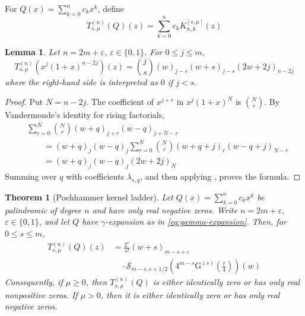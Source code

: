 \documentclass[a4paper,11pt,reqno]{amsart}
\numberwithin{equation}{section}
\newtheorem{theorem}{Theorem}
\newtheorem{lemma}{Lemma}
\theoremstyle{remark}
\newcommand{\Gpoly}{\mathrm{G}}     %
\begin{document}
For \(Q(x)=\sum_{k=0}^{n}c_kx^k\), define
\[
  T_{s,\mu}^{(n)}(Q)(z)
  =
  \sum_{k=0}^{n}c_kK_{n,k}^{[s,\mu]}(z)
\]

\begin{lemma}\label{lem:rung-action}
Let \(n=2m+\varepsilon\), \(\varepsilon\in\{0,1\}\). For \(0\leq j\leq m\),
\[
  T_{s,\mu}^{(n)}
  \left(x^j(1+x)^{n-2j}\right)(z)
  =
  \binom{j}{s}
  (w)_{j-s}(w+s)_{j-s}(2w+2j)_{n-2j}
\]
where the right-hand side is interpreted as \(0\) if \(j<s\).
\end{lemma}

\begin{proof}
Put \(N=n-2j\). The coefficient of \(x^{j+r}\) in \(x^j(1+x)^N\) is \(\binom Nr\). By Vandermonde's identity for rising factorials,
\[
\begin{aligned}
  &\sum_{r=0}^{N}\binom Nr
  (w+q)_{j+r}(w-q)_{j+N-r}  \\
  &\qquad =
  (w+q)_j(w-q)_j
  \sum_{r=0}^{N}\binom Nr
  (w+q+j)_r(w-q+j)_{N-r}  \\
  &\qquad =
  (w+q)_j(w-q)_j(2w+2j)_N
\end{aligned}
\]
Summing over \(q\) with coefficients \(\lambda_{s,q}\), and then applying , proves the formula.
\end{proof}

\begin{theorem}[Pochhammer kernel ladder]\label{thm:ladder}
Let \(Q(x)=\sum_{k=0}^{n}c_kx^k\) be palindromic of degree \(n\) and have only real negative zeros. Write \(n=2m+\varepsilon\), \(\varepsilon\in\{0,1\}\), and let \(Q\) have \(\gamma\)-expansion as in \eqref{eq:gamma-expansion}. Then, for \(0\leq s\leq m\),
\begin{equation}\label{eq:ladder}
\begin{aligned}
  T_{s,\mu}^{(n)}(Q)(z)
  &=
  \frac{2^\varepsilon}{s!}
  (w+s)_{m-s+\varepsilon}  \\
  &\quad\cdot
  \mathcal S_{m-s,s+1/2}
  \left(
    4^{m-s}\Gpoly^{(s)}\left(\frac t4\right)
  \right)(w)
\end{aligned}
\end{equation}
Consequently, if \(\mu\geq0\), then \(T_{s,\mu}^{(n)}(Q)\) is either identically zero or has only real nonpositive zeros. If \(\mu>0\), then it is either identically zero or has only real negative zeros.
\end{theorem}
\end{document}
